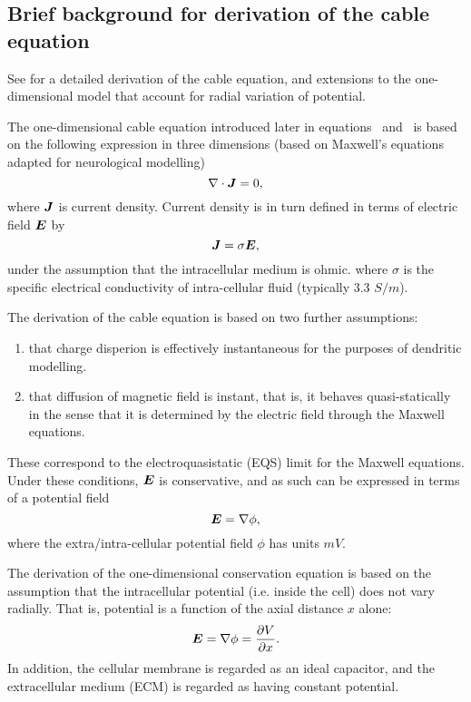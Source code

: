 \subsection{Brief background for derivation of the cable equation}
See \cite{lindsay_2004} for a detailed derivation of the cable equation, and extensions to the one-dimensional model that account for radial variation of potential.

The one-dimensional cable equation introduced later in equations~ and~ is based on the following expression in three dimensions (based on Maxwell's equations adapted for neurological modelling)
\begin{equation}
    \nabla \cdot \bm{J} = 0,
    \label{eq:J}
\end{equation}
where $\bm{J}$ is current density.
Current density is in turn defined in terms of electric field $\bm{E}$ by
\begin{equation}
    \bm{J} = \sigma \bm{E},
\end{equation}
under the assumption that the intracellular medium is ohmic.
where $\sigma$ is the specific electrical conductivity of intra-cellular fluid (typically 3.3 $S/m$).

The derivation of the cable equation is based on two further assumptions:
\begin{enumerate}
    \item that charge disperion is effectively instantaneous for the purposes of dendritic modelling.
    \item that diffusion of magnetic field is instant, that is, it behaves quasi-statically in the sense that it is determined by the electric field through the Maxwell equations.
\end{enumerate}
These correspond to the electroquasistatic (EQS) limit for the Maxwell equations.
Under these conditions, $\bm{E}$ is conservative, and as such can be expressed in terms of a potential field
\begin{equation}
    \bm{E} = \nabla \phi,
\end{equation}
where the extra/intra-cellular potential field $\phi$ has units $mV$.

The derivation of the one-dimensional conservation equation  is based on the assumption that the intracellular potential (i.e. inside the cell) does not vary radially.
That is, potential is a function of the axial distance $x$ alone:
\begin{equation}
    \bm{E} = \nabla \phi = \frac{\partial{V}}{\partial{x}}.
\end{equation}
In addition, the cellular membrane is regarded as an ideal capacitor, and the extracellular medium (ECM) is regarded as having constant potential.

